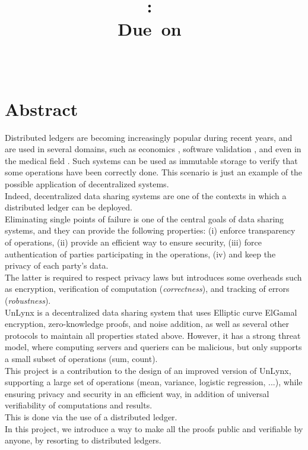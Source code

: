 \documentclass{article}
\title{
\logoepfl
\vspace{2in}
\textmd{\textbf{\hmwkClass:\ \hmwkTitle}}\\
\normalsize\vspace{0.1in}\small{Due\ on\ \hmwkDueDate}\\
\vspace{0.1in}\large{\textit{\hmwkClassInstructor\ \hmwkClassTime}}
\author{\textbf{\hmwkAuthorName}}
\vspace{3in}
}
\begin{document}
\maketitle

\newpage
\section*{Abstract}
Distributed ledgers are becoming increasingly popular during recent years, and are used in several domains, such as economics \cite{bitcoin}, software validation \cite{chainiac}, and even in the medical field \cite{health}. Such systems can be used as immutable storage to verify that some operations have been correctly done. This scenario is just an example of the possible application of decentralized systems.\\
Indeed, decentralized data sharing systems are one of the contexts in which a distributed ledger can be deployed.\\
Eliminating single points of failure is one of the central goals of data sharing systems,  and they can provide the following properties: (i) enforce transparency of operations, (ii) provide an efficient way to ensure security,  (iii) force authentication of parties participating in the operations, (iv) and keep the privacy of each party's data.\\
The latter is required to respect privacy laws but introduces some overheads such as encryption, verification of computation (\textit{correctness}), and tracking of errors (\textit{robustness}).\\
UnLynx \cite{unlynx} is a decentralized data sharing system that uses Elliptic curve ElGamal encryption, zero-knowledge proofs, and noise addition, as well as several other protocols to maintain all properties stated above. However, it has a strong threat model, where computing servers and queriers can be malicious, but only supports a small subset of operations (sum, count).\\
This project is a contribution to the design of an improved version of UnLynx, supporting a large set of operations (mean, variance, logistic regression, ...), while ensuring privacy and security in an efficient way, in addition of universal verifiability of computations and results.\\
This is done via the use of a distributed ledger.\\
In this project, we introduce a way to make all the proofs public and verifiable by anyone, by resorting to distributed ledgers.
\end{document}
